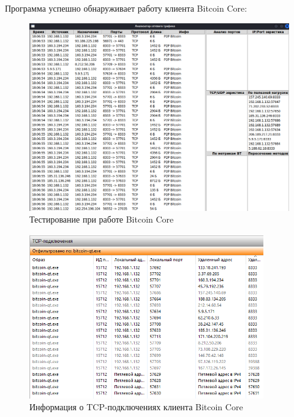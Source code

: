 \documentclass[bachelor, och, coursework]{SCWorks}
\begin{document}
Программа успешно обнаруживает работу клиента Bitcoin Core:
\begin{figure}[H]
    \centering
    \includegraphics[width=1\textwidth]{test4.png}
    \caption{Тестирование при работе Bitcoin Core}
\end{figure}

\begin{figure}[H]
    \centering
    \includegraphics[width=0.9\textwidth]{test4_bc.png}
    \caption{Информация о TCP-подключениях клиента Bitcoin Core}
    \label{test4_bc}
\end{figure}
\end{document}
